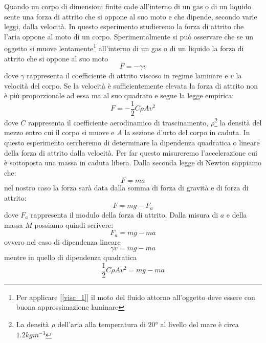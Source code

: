 \documentclass[a4paper,10pt,oneside]{article}
\begin{document}
Quando un corpo di dimensioni finite cade all'interno di un gas o di un liquido sente una forza di attrito che si oppone al suo moto e che dipende, secondo varie leggi, dalla velocità. In questo esperimento studieremo la forza di attrito che l'aria oppone al moto di un corpo. Sperimentalmente si può osservare che se un oggetto si muove lentamente\footnote{Per applicare [\ref{visc_1}] il moto del fluido attorno all'oggetto deve essere con buona approssimazione laminare} all'interno di un gas o di un liquido la forza di attrito che si oppone al suo moto
\begin{equation}\label{visc_1}
 F=-\gamma v
\end{equation}
dove $\gamma$ rappresenta il coefficiente di attrito viscoso in regime laminare e $v$ la velocità del corpo.
Se la velocità è sufficientemente elevata la forza di attrito non è più proporzionale ad essa ma al suo quadrato e segue la legge empirica:
\begin{equation}
 F=-\frac{1}{2}C\rho A v^2
\end{equation}
dove $C$ rappresenta il coefficiente aerodinamico di trascinamento, $\rho$\footnote{La densità $\rho$ dell'aria alla temperatura di $20°$ al livello del mare è circa $1.2kgm^{-3}$} la densità del mezzo entro cui il corpo si muove e $A$ la sezione d'urto del corpo in caduta.
In questo esperimento cercheremo di determinare la dipendenza quadratica o lineare della forza di attrito dalla velocità. Per far questo misureremo l'accelerazione cui è sottoposta una massa in caduta libera. Dalla seconda legge di Newton sappiamo che:
\begin{equation}
 F=ma
\end{equation}
nel nostro caso la forza sarà data dalla somma di forza di gravità e di forza di attrito:
\begin{equation}
 F=mg-F_a
\end{equation}
dove $F_a$ rappresenta il modulo della forza di attrito. Dalla misura di $a$ e della massa $M$  possiamo quindi scrivere:
\begin{equation}
F_a=mg-ma
\end{equation}
ovvero nel caso di dipendenza lineare
\begin{equation}
\gamma v=mg-ma
\end{equation}
mentre in quello di dipendenza quadratica
\begin{equation}
 \frac{1}{2}C\rho A v^2=mg-ma
\end{equation}
\end{document}
